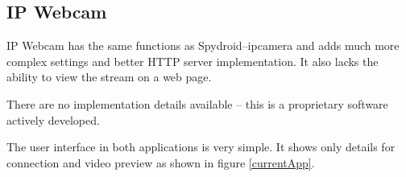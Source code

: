 \subsection{IP Webcam}
IP Webcam has the same functions as Spydroid--ipcamera and adds much more complex settings and better HTTP server implementation. It also lacks the ability to view the stream on a web page.

There are no implementation details available -- this is a proprietary software actively developed.\\



The user interface in both applications is very simple. It shows only details for connection and video preview as shown in figure \ref{currentApp}.

